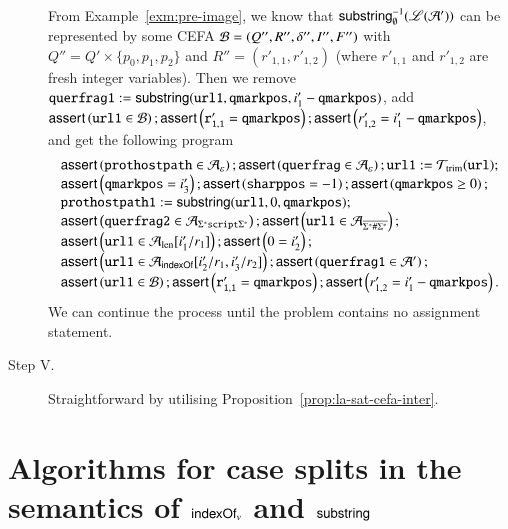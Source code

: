 \begin{description}
		From Example~\ref{exm:pre-image}, we know that $\mathsf{substring}^{-1}_\emptyset(\mathscr{L}(\mathcal{A}'))$ can be represented by some CEFA $\mathcal{B}=(Q'', R'', \delta'', I'', F'')$ with $Q''= Q' \times \{p_0,p_1,p_2\}$ and $R''=(r'_{1,1}, r'_{1,2})$ (where $r'_{1,1}$ and $r'_{1,2}$ are fresh integer variables). Then we remove $\mathtt{querfrag1} := \mathsf{substring}(\mathtt{url1, qmarkpos}, i'_1 - \mathtt{qmarkpos})$, add $\textsf{assert}\left(\mathtt{url1} \in \mathcal{B}\right);\textsf{assert}\left(\mathtt{r'_{1,1}= qmarkpos}\right); \textsf{assert}\left(r'_{1,2}=i'_1 - \mathtt{qmarkpos}\right)$, and get the following program
		\[ 
		\begin{array}{l}
		\textsf{assert}\left(\mathtt{prothostpath} \in \mathcal{A}_\varepsilon\right); \textsf{assert}\left(\mathtt{querfrag} \in \mathcal{A}_\varepsilon\right); \mathtt{url1} := \mathcal{T}_{\rm trim}(\mathtt{url}); \\
		\textsf{assert}\left(\mathtt{qmarkpos} = i'_3\right); \textsf{assert}\left(\mathtt{sharppos} =-1 \right); \textsf{assert}\left(\mathtt{qmarkpos} \ge 0\right); \\ 
		\mathtt{prothostpath1} := \mathsf{substring}(\mathtt{url1}, 0, \mathtt{qmarkpos});\\
		\textsf{assert}\left(\mathtt{querfrag2} \in  \mathcal{A}_{\Sigma^*\mathtt{script}\Sigma^*}\right);  
		\textsf{assert}\left(\mathtt{url1} \in  \mathcal{A}_{\overline{\Sigma^*\#\Sigma^*}}\right); \\
		\textsf{assert}\left(\mathtt{url1} \in \mathcal{A}_{\rm len}[i'_1/r_1]\right);  \textsf{assert}\left(0= i'_2\right); \\
		\textsf{assert}\left(\mathtt{url1} \in \mathcal{A}_{\mathsf{indexOf}}[i'_2/r_1, i'_3/r_2]\right);  \textsf{assert}\left(\mathtt{querfrag1} \in \mathcal{A}'\right);\\
		\textsf{assert}\left(\mathtt{url1} \in \mathcal{B}\right);\textsf{assert}\left(\mathtt{r'_{1,1} = qmarkpos} \right); \textsf{assert}\left(r'_{1,2}=i'_1 - \mathtt{qmarkpos}\right).
		\end{array}
		\]
		We can continue the process until the problem contains no assignment statement.
		\item[Step V.]  Straightforward by utilising Proposition~\ref{prop:la-sat-cefa-inter}. 
	\end{description}








\section{Algorithms for case splits in the semantics of $\mathsf{indexOf}_v$ and $\mathsf{substring}$}\label{app:case-split-semantics}

